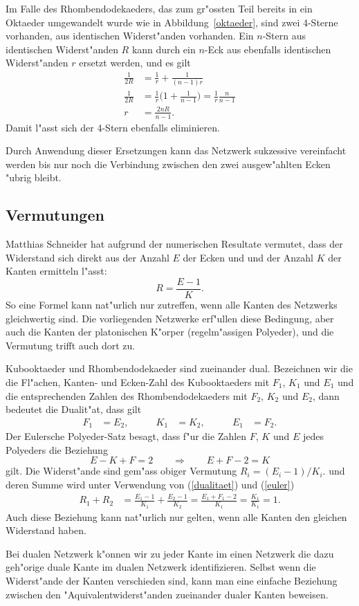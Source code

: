 \documentclass[a4paper,12pt]{article}
\begin{document}
Im Falle des Rhombendodekaeders, das zum gr"ossten Teil bereits in
ein Oktaeder umgewandelt wurde wie in Abbildung~\ref{oktaeder},
sind zwei 4-Sterne vorhanden, aus identischen Widerst"anden
vorhanden.
Ein $n$-Stern aus identischen Widerst"anden $R$ kann durch ein $n$-Eck
aus ebenfalls identischen Widerst"anden $r$ ersetzt werden, und es
gilt
\begin{align*}
\frac{1}{2R}
&=
\frac{1}{r}+\frac{1}{(n-1)r}
\\
\frac{1}{2R}
&=
\frac{1}{r}
\biggl(1+\frac1{n-1}\biggr)
=
\frac{1}{r}\frac{n}{n-1}
\\
r&=\frac{2nR}{n-1}.
\end{align*}
Damit l"asst sich der 4-Stern ebenfalls eliminieren.

Durch Anwendung dieser Ersetzungen kann das Netzwerk sukzessive 
vereinfacht werden bis nur noch die Verbindung zwischen den zwei
ausgew"ahlten Ecken "ubrig bleibt.

\subsection{Vermutungen}
Matthias Schneider hat aufgrund der numerischen Resultate vermutet,
dass der Widerstand sich direkt aus der Anzahl $E$ der Ecken und
und der Anzahl $K$ der Kanten ermitteln l"asst:
\[
R=\frac{E-1}{K}.
\]
So eine Formel kann nat"urlich nur zutreffen, wenn alle Kanten
des Netzwerks gleichwertig sind. 
Die vorliegenden Netzwerke erf"ullen diese Bedingung, aber
auch die Kanten der platonischen K"orper (regelm"assigen Polyeder),
und die Vermutung trifft auch dort zu.

Kubooktaeder und Rhombendodekaeder sind zueinander dual.
Bezeichnen wir die die Fl"achen\-, Kanten- und Ecken-Zahl des
Kubooktaeders mit $F_1$, $K_1$ und $E_1$ und die entsprechenden
Zahlen des Rhombendodekaeders mit $F_2$, $K_2$ und $E_2$, dann
bedeutet die Dualit"at, dass gilt
\begin{equation}
\begin{aligned}
F_1&=E_2,&\qquad
K_1&=K_2,&\qquad
E_1&=F_2.
\end{aligned}
\label{dualitaet}
\end{equation}
Der Eulersche Polyeder-Satz besagt, dass f"ur die Zahlen $F$, $K$ und $E$
jedes Polyeders die Beziehung
\begin{equation}
E-K+F=2
\qquad
\Rightarrow
\qquad
E+F-2=K
\label{euler}
\end{equation}
gilt.
Die Widerst"ande sind gem"ass obiger Vermutung $R_i=(E_i-1)/K_i$.
und deren Summe wird unter Verwendung von (\ref{dualitaet}) 
und (\ref{euler})
\begin{align*}
R_1+R_2
&=
\frac{E_1-1}{K_1}
+
\frac{E_2-1}{K_2}
=
\frac{E_1+F_1-2}{K_1}
=
\frac{K_1}{K_1}=1.
\end{align*}
Auch diese Beziehung kann nat"urlich nur gelten, wenn alle Kanten den
gleichen Widerstand haben.

Bei dualen Netzwerk k"onnen wir zu jeder Kante im einen Netzwerk die dazu
geh"orige duale Kante im dualen Netzwerk identifizieren.
Selbst wenn die Widerst"ande der Kanten verschieden sind, kann man
eine einfache Beziehung zwischen den "Aquivalentwiderst"anden zueinander
dualer Kanten beweisen.
\end{document}
